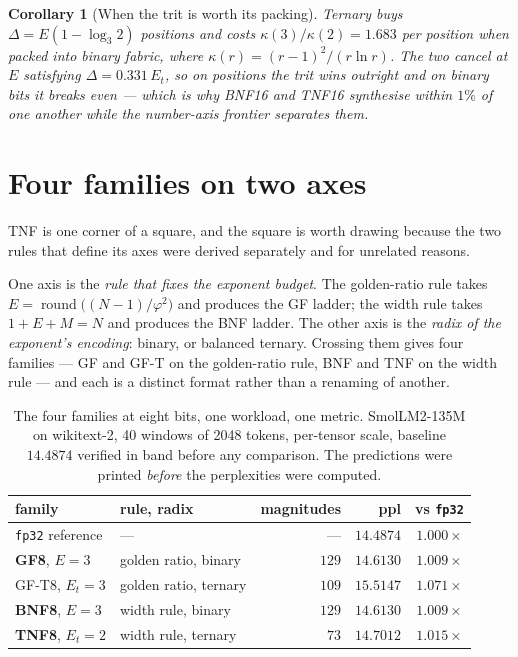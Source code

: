 \documentclass[11pt]{article}
\newtheorem{corollary}{Corollary}
\theoremstyle{definition}
\begin{document}
\begin{corollary}[When the trit is worth its packing]
\label{cor:worth}
Ternary buys $\Delta = E(1-\log_3 2)$ positions and costs
$\kappa(3)/\kappa(2) = 1.683$ per position when packed into binary fabric, where
$\kappa(r) = (r-1)^2/(r \ln r)$. The two cancel at $E$ satisfying
$\Delta = 0.331\,E_t$, so on positions the trit wins outright and on binary bits
it breaks even --- which is why BNF16 and TNF16 synthesise within $1\%$ of one
another while the number-axis frontier separates them.
\end{corollary}


\section{Four families on two axes}\label{sec:fourfamilies}

TNF is one corner of a square, and the square is worth drawing because the two
rules that define its axes were derived separately and for unrelated reasons.

One axis is the \emph{rule that fixes the exponent budget}. The golden-ratio
rule takes $E=\operatorname{round}\!\bigl((N-1)/\varphi^{2}\bigr)$ and produces
the GF ladder; the width rule takes $1+E+M=N$ and produces the BNF ladder. The
other axis is the \emph{radix of the exponent's encoding}: binary, or balanced
ternary. Crossing them gives four families --- GF and GF-T on the golden-ratio
rule, BNF and TNF on the width rule --- and each is a distinct format rather
than a renaming of another.

\begin{table}[t]\centering
\caption{The four families at eight bits, one workload, one metric.
SmolLM2-135M on wikitext-2, 40 windows of 2048 tokens, per-tensor scale,
baseline $14.4874$ verified in band before any comparison. The predictions were
printed \emph{before} the perplexities were computed.}
\label{tab:fourfam}
\begin{tabular}{llrrr}
\toprule
family & rule, radix & magnitudes & ppl & vs \texttt{fp32} \\
\midrule
\texttt{fp32} reference & --- & --- & $14.4874$ & $1.000\times$ \\
\midrule
\textbf{GF8}, $E{=}3$   & golden ratio, binary  & $129$ & $\mathbf{14.6130}$ & $1.009\times$ \\
GF-T8, $E_t{=}3$        & golden ratio, ternary & $109$ & $15.5147$ & $1.071\times$ \\
\textbf{BNF8}, $E{=}3$  & width rule, binary    & $129$ & $\mathbf{14.6130}$ & $1.009\times$ \\
\textbf{TNF8}, $E_t{=}2$& width rule, ternary   & $73$  & $\mathbf{14.7012}$ & $1.015\times$ \\
\bottomrule
\end{tabular}
\end{table}
\end{document}
